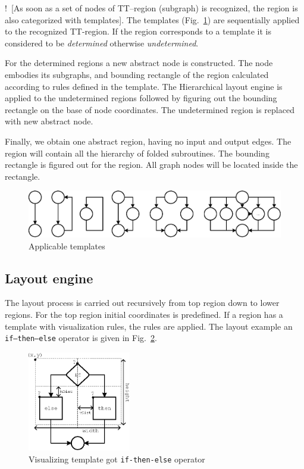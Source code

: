 \documentclass[conference]{IEEEtran}
\newcommand{\nnn}[2][ncolor]{\noindent%
\textcolor{eclr}{!\ [}\textcolor{#1}{#2}\textcolor{eclr}{]}}
\begin{document}

\nnn{As soon as a set of nodes of TT--region (subgraph) is recognized, the region is also categorized with templates}.  The templates (Fig.~\ref{fig:Regions}) are sequentially applied to the recognized TT-region.  If the region corresponds to a template it is considered to be \emph{determined} otherwise \emph{undetermined}.

For the determined regions a new abstract node is constructed.  The node embodies its subgraphs, and bounding rectangle of the region calculated according to rules defined in the template.  The Hierarchical layout engine is applied to the undetermined regions followed by figuring out the bounding rectangle on the base of node coordinates.  The undetermined region is replaced with new abstract node.

Finally, we obtain one abstract region, having no input and output edges.  The region will contain all the hierarchy of folded subroutines.  The bounding rectangle is figured out for the region.  All graph nodes will be located inside the rectangle.

\begin{figure}[htbp]
	\centering
		\includegraphics[width=1\textwidth]{Pic/Reg.eps}
	\caption{Applicable templates}
	\label{fig:Regions}
\end{figure}

\subsection{Layout engine}
\label{sec:raskladka-process}

The layout process is carried out recursively from top region down to lower regions.  For the top region initial coordinates is predefined.  If a region has a template with visualization rules, the rules are applied.  The layout example an \texttt{if--then--else} operator is given in Fig.~\ref{fig:IfThenElse}.

\begin{figure}[htbp]
	\centering
		\includegraphics[width=0.4\textwidth]{Pic/IfThenElse.eps}
	\caption{Visualizing template got \texttt{if-then-else} operator}
	\label{fig:IfThenElse}
\end{figure}
\end{document}
